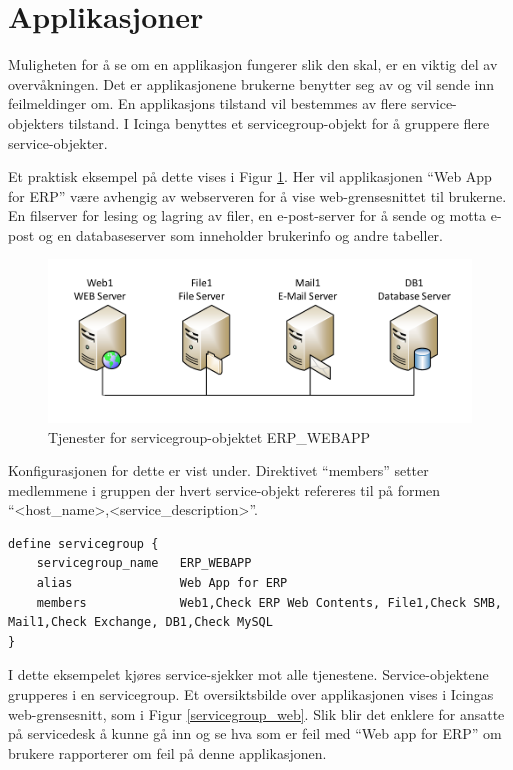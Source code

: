\section{Applikasjoner}
Muligheten for å se om en applikasjon fungerer slik den skal, er en viktig del av overvåkningen. Det er applikasjonene brukerne benytter seg av og vil sende inn feilmeldinger om. En applikasjons tilstand vil bestemmes av flere service-objekters tilstand. I Icinga benyttes et servicegroup-objekt for å gruppere flere service-objekter.

Et praktisk eksempel på dette vises i Figur \ref{servicegroup_layout}. Her vil applikasjonen ``Web App for ERP'' være avhengig av webserveren for å vise web-grensesnittet til brukerne. En filserver for lesing og lagring av filer, en e-post-server for å sende og motta e-post og en databaseserver som inneholder brukerinfo og andre tabeller. 

\begin{figure}[H]
    \centering
    \includegraphics[scale=0.6]{img/servicegroup_layout}
    \caption{Tjenester for servicegroup-objektet ERP\_WEBAPP}
    \label{servicegroup_layout}
\end{figure}

Konfigurasjonen for dette er vist under. Direktivet ``members'' setter medlemmene i gruppen der hvert service-objekt refereres til på formen ``<host\_name>,<service\_description>''.

\begin{lstlisting}[style=example]
define servicegroup {
	servicegroup_name	ERP_WEBAPP
	alias 				Web App for ERP
	members 			Web1,Check ERP Web Contents, File1,Check SMB, Mail1,Check Exchange, DB1,Check MySQL
}
\end{lstlisting}

I dette eksempelet kjøres service-sjekker mot alle tjenestene. Service-objektene grupperes i en servicegroup. Et oversiktsbilde over applikasjonen vises i Icingas web-grensesnitt, som i Figur \ref{servicegroup_web}. Slik blir det enklere for ansatte på servicedesk å kunne gå inn og se hva som er feil med ``Web app for ERP'' om brukere rapporterer om feil på denne applikasjonen.

